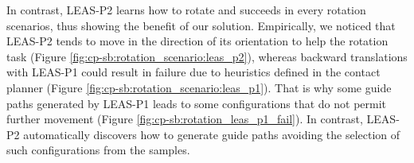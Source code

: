 In contrast, LEAS-P2 learns how to rotate and succeeds in every rotation scenarios, thus showing the benefit of our solution.
Empirically, we noticed that LEAS-P2 tends to move in the direction of its orientation to help the rotation task (Figure \ref{fig:cp-sb:rotation_scenario:leas_p2}), whereas backward translations with LEAS-P1 could result in failure due to heuristics defined in the contact planner (Figure \ref{fig:cp-sb:rotation_scenario:leas_p1}).
That is why some guide paths generated by LEAS-P1 leads to some configurations that do not permit further movement (Figure \ref{fig:cp-sb:rotation_leas_p1_fail}). 
In contrast, LEAS-P2 automatically discovers how to generate guide paths avoiding the selection of such configurations from the samples.


